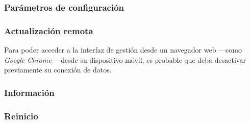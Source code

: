 \subsubsection{Parámetros de configuración}
\label{sec:config}

\subsubsection{Actualización remota}
\label{sec:actualizar}

Para poder acceder a la interfaz de gestión desde un navegador web ---como \textit{Google Chrome}--- desde su dispositivo móvil, es probable que deba desactivar previamente su conexión de datos.
\attend

\subsubsection{Información}
\label{sec:info}

\subsubsection{Reinicio}
\label{sec:reinicio}

